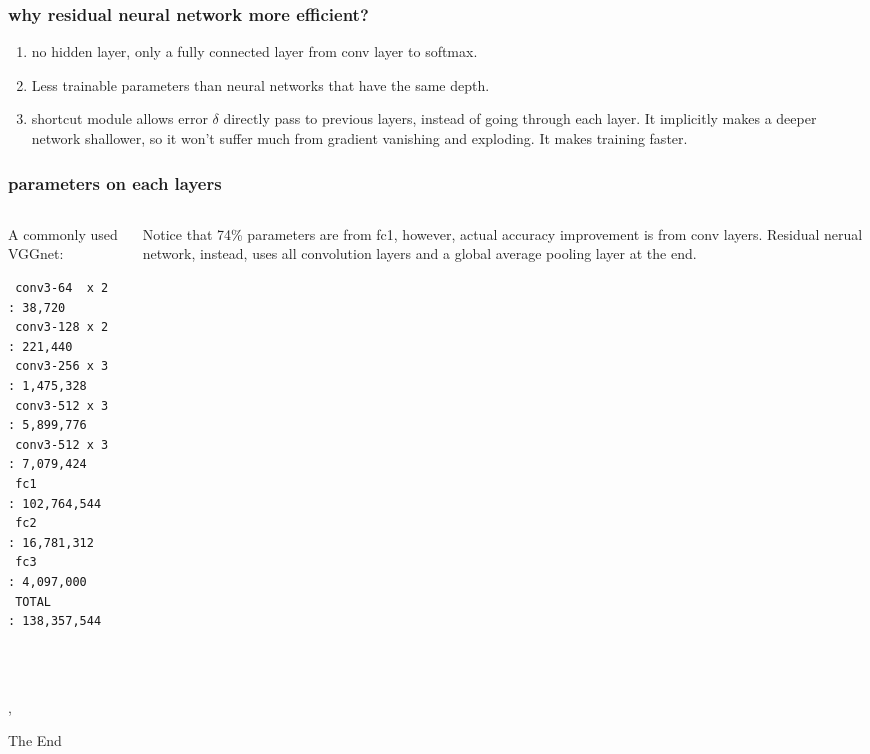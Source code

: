 \documentclass{beamer}
\begin{document}
\begin{frame}
\frametitle{why residual neural network more efficient?}
\begin{enumerate}
\item no hidden layer, only a fully connected layer from conv layer to softmax.
\item Less trainable parameters than neural networks that have the same depth.
\item shortcut module allows error $\delta$ directly pass to previous layers, 
instead of going through each layer. 
It implicitly makes a deeper network shallower, so it won't suffer much from gradient vanishing and exploding.
It makes training faster.
\end{enumerate}
\end{frame}
\begin{frame}[fragile]
\frametitle{parameters on each layers}
\begin{columns}
\begin{column}{.5\textwidth}
 A commonly used VGGnet:
\begin{verbatim}
 conv3-64  x 2 : 38,720
 conv3-128 x 2 : 221,440
 conv3-256 x 3 : 1,475,328
 conv3-512 x 3 : 5,899,776
 conv3-512 x 3 : 7,079,424
 fc1           : 102,764,544
 fc2           : 16,781,312
 fc3           : 4,097,000
 TOTAL         : 138,357,544
\end{verbatim}
\end{column}
\begin{column}{.5\textwidth}
Notice that 74\% parameters are from fc1, however, actual accuracy improvement is from conv layers. Residual nerual network, instead, uses all convolution layers
 and a global average pooling layer at the end.
\end{column}
\end{columns}
{\color{white}{ a}}\\
{\color{white}{ a}}\\
\cite{springenberg2014striving},
\end{frame}


\begin{frame}
\Huge{\centerline{The End}}
\end{frame}
\end{document}
